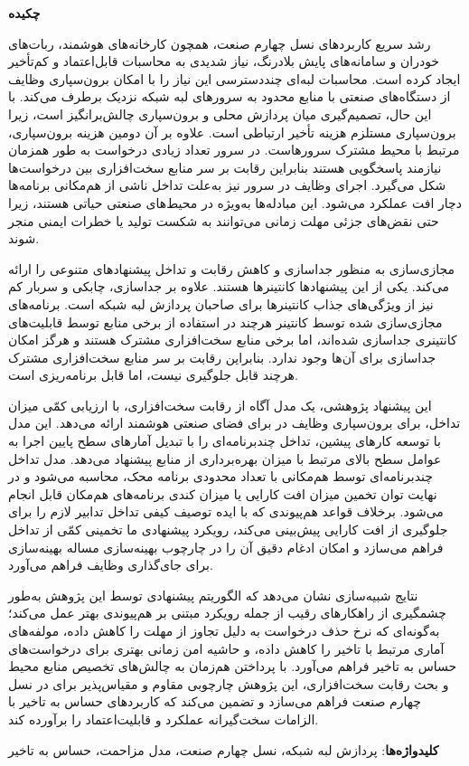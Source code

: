 \begin{center}
\textbf{چکیده}
\end{center}
\noindent

رشد سریع کاربردهای نسل چهارم صنعت، همچون کارخانه‌های هوشمند، ربات‌های خودران و سامانه‌های پایش بلادرنگ، نیاز شدیدی به محاسبات قابل‌اعتماد و کم‌تأخیر ایجاد کرده است. محاسبات لبه‌ای چنددسترسی  این نیاز را با امکان برون‌سپاری وظایف از دستگاه‌های صنعتی با منابع محدود به سرورهای لبه شبکه نزدیک برطرف می‌کند. با این حال، تصمیم‌گیری میان پردازش محلی و برون‌سپاری چالش‌برانگیز است، زیرا برون‌سپاری مستلزم هزینه تأخیر ارتباطی است. علاوه بر آن دومین هزینه برون‌سپاری، مرتبط با محیط مشترک سرورهاست. در سرور تعداد زیادی درخواست به طور همزمان نیازمند پاسخگویی هستند بنابراین رقابت بر سر منابع سخت‌افزاری بین درخواست‌ها شکل می‌گیرد. اجرای وظایف در سرور نیز به‌علت تداخل ناشی از هم‌مکانی برنامه‌ها دچار افت عملکرد می‌شود. این مبادله‌ها به‌ویژه در محیط‌های صنعتی حیاتی هستند، زیرا حتی نقض‌های جزئی مهلت زمانی می‌توانند به شکست تولید یا خطرات ایمنی منجر شوند.

مجازی‌سازی به منظور جداسازی و کاهش رقابت و تداخل پیشنهادهای متنوعی را ارائه می‌کند. یکی از این پیشنهادها کانتینرها هستند. علاوه بر جداسازی، چابکی و سربار کم نیز از ویژگی‌های جذاب کانتینرها برای صاحبان پردازش لبه شبکه است. برنامه‌های مجازی‌سازی شده توسط کانتینر هرچند در استفاده از برخی منابع توسط قابلیت‌های کانتینری جداسازی شده‌اند، اما برخی منابع سخت‌افزاری مشترک هستند و هرگز امکان جداسازی برای آن‌ها وجود ندارد. بنابراین رقابت بر سر منابع سخت‌افزاری مشترک هرچند قابل جلوگیری نیست، اما قابل برنامه‌ریزی است.

این پیشنهاد پژوهشی، یک مدل آگاه از رقابت سخت‌افزاری، با ارزیابی کمّی میزان تداخل، برای برون‌سپاری وظایف در  برای فضای صنعتی هوشمند ارائه می‌دهد. این مدل با توسعه کارهای پیشین، تداخل چندبرنامه‌ای را با تبدیل آمارهای سطح پایین اجرا به عوامل سطح بالای مرتبط با میزان بهره‌برداری از منابع پیشنهاد می‌دهد. مدل تداخل چندبرنامه‌ای توسط هم‌مکانی با تعداد محدودی برنامه محک، محاسبه می‌شود و در نهایت توان تخمین میزان افت کارایی یا میزان کندی برنامه‌های هم‌مکان قابل انجام می‌شود. برخلاف قواعد هم‌پیوندی که با ایده توصیف کیفی تداخل تدابیر لازم را برای جلوگیری از افت کارایی پیش‌بینی می‌کند، رویکرد پیشنهادی ما تخمینی کمّی از تداخل فراهم می‌سازد و امکان ادغام دقیق آن را در چارچوب بهینه‌سازی مساله بهینه‌سازی برای جای‌گذاری وظایف فراهم می‌آورد.

نتایج شبیه‌سازی نشان می‌دهد که الگوریتم پیشنهادی توسط این پژوهش به‌طور چشمگیری از راهکارهای رقیب از جمله رویکرد مبتنی بر هم‌پیوندی بهتر عمل می‌کند؛ به‌گونه‌ای که نرخ حذف درخواست به دلیل تجاوز از مهلت را کاهش داده، مولفه‌های آماری مرتبط با تاخیر را کاهش داده، و حاشیه امن زمانی بهتری برای درخواست‌های حساس به تاخیر فراهم می‌آورد. با پرداختن هم‌زمان به چالش‌های تخصیص منابع محیط  و بحث رقابت سخت‌افزاری، این پژوهش چارچوبی مقاوم و مقیاس‌پذیر برای  در نسل چهارم صنعت فراهم می‌سازد و تضمین می‌کند که کاربردهای حساس به تاخیر با الزامات سخت‌گیرانه عملکرد و قابلیت‌اعتماد را برآورده کند.

\bigskip
\noindent \textbf{کلیدواژه‌ها}: پردازش لبه شبکه، نسل چهارم صنعت، مدل مزاحمت، حساس به تاخیر
\newpage
